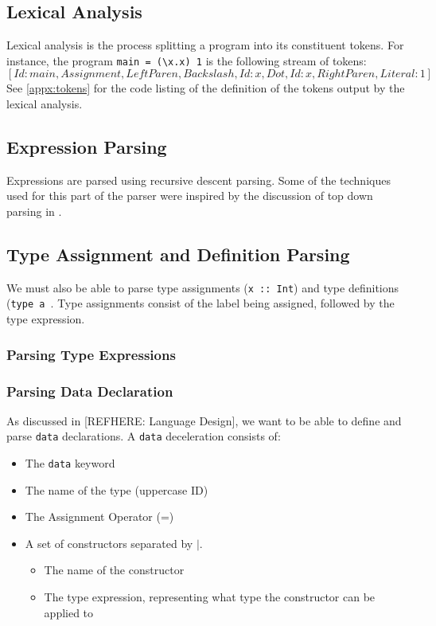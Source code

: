 \documentclass[
author=Kiran Sturt,
degree=BSc,
title=Implementing a Step by Step Evaluator for a Simple Functional Programming language,
unit=COMS30045,twoside]{dissertation}
\theoremstyle{definition}
\theoremstyle{break}
\theoremstyle{definition}
\begin{document}
\subsection{Lexical Analysis}
Lexical analysis is the process splitting a program into its constituent tokens. For instance, the program \verb|main = (\x.x) 1| is the following stream of tokens: \[[Id: main, Assignment, LeftParen, Backslash, Id: x, Dot, Id: x, RightParen, Literal: 1]\]
See \ref{appx:tokens} for the code listing of the definition of the tokens output by the lexical analysis.

\subsection{Expression Parsing}
Expressions are parsed using recursive descent parsing. Some of the techniques used for this part of the parser were inspired by the discussion of top down parsing in \cite{dragon_book}. 

\subsection{Type Assignment and Definition Parsing}
We must also be able to parse type assignments (\verb|x :: Int|) and type definitions (\verb|type a |. Type assignments consist of the label being assigned, followed by the type expression. 

\subsubsection{Parsing Type Expressions}

\subsubsection{Parsing Data Declaration} 
As discussed in [REFHERE: Language Design], we want to be able to define and parse \verb|data| declarations. A \verb|data| deceleration consists of: 
\begin{itemize}
    \item The \verb|data| keyword
    \item The name of the type (uppercase ID)
    \item The Assignment Operator (=)
    \item A set of constructors separated by \(\mid\). 
        \begin{itemize}
            \item The name of the constructor
            \item The type expression, representing what type the constructor can be applied to 
        \end{itemize}
\end{itemize}
\end{document}
